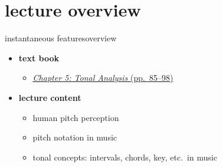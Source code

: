 

\subtitle{Part 6.1: Tonal Analysis Introduction}


	

    \section[overview]{lecture overview}
        \begin{frame}{instantaneous features}{overview}
            \begin{itemize}
                \item   \textbf{text book}  
                    \begin{itemize}
                        \item   \href{http://ieeexplore.ieee.org/xpl/articleDetails.jsp?tp=&arnumber=&}{\underline{\textit{Chapter 5: Tonal Analysis} (pp.~85--98)}}
                    \end{itemize}
                \bigskip
                \item<2->   \textbf{lecture content}
                    \begin{itemize}
                        \item<2->   human pitch perception
                        \item<3->   pitch notation in music
                        \item<4->   tonal concepts: intervals, chords, key, etc.\ in music
                    \end{itemize}
            \end{itemize}
        \end{frame}


